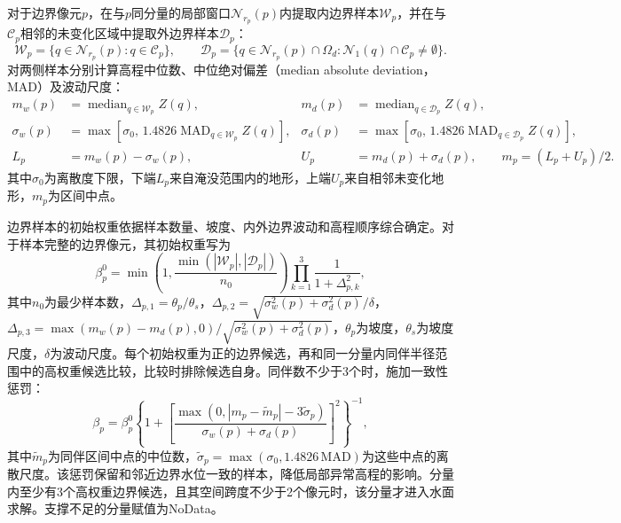 \documentclass[authoryear,preprint,12pt]{elsarticle}
\begin{document}
对于边界像元\(p\)，在与\(p\)同分量的局部窗口\(\mathcal N_{r_p}(p)\)内提取内边界样本\(\mathcal W_p\)，并在与\(\mathcal C_p\)相邻的未变化区域中提取外边界样本\(\mathcal D_p\)：
\begin{equation}\label{eq:ccdepth_samples}
 \mathcal W_p=\{q\in\mathcal N_{r_p}(p):q\in\mathcal C_p\},\qquad
 \mathcal D_p=\{q\in\mathcal N_{r_p}(p)\cap\Omega_d:\mathcal N_1(q)\cap\mathcal C_p\neq\emptyset\}.
\end{equation}
对两侧样本分别计算高程中位数、中位绝对偏差（median absolute deviation，MAD）及波动尺度：
\begin{equation}\label{eq:ccdepth_interval}
 \begin{aligned}
 m_w(p)&=\operatorname{median}_{q\in\mathcal W_p}Z(q),&
 m_d(p)&=\operatorname{median}_{q\in\mathcal D_p}Z(q),\\
 \sigma_w(p)&=\max\!\left[\sigma_0,\,1.4826\operatorname{MAD}_{q\in\mathcal W_p}Z(q)\right],&
 \sigma_d(p)&=\max\!\left[\sigma_0,\,1.4826\operatorname{MAD}_{q\in\mathcal D_p}Z(q)\right],\\
 L_p&=m_w(p)-\sigma_w(p),&
 U_p&=m_d(p)+\sigma_d(p),\qquad m_p=(L_p+U_p)/2.
 \end{aligned}
\end{equation}
其中\(\sigma_0\)为离散度下限，下端\(L_p\)来自淹没范围内的地形，上端\(U_p\)来自相邻未变化地形，\(m_p\)为区间中点。

边界样本的初始权重依据样本数量、坡度、内外边界波动和高程顺序综合确定。对于样本完整的边界像元，其初始权重写为
\begin{equation}\label{eq:ccdepth_weight}
 \beta_p^0=
 \min\!\left(1,\frac{\min(|\mathcal W_p|,|\mathcal D_p|)}{n_0}\right)
 \prod_{k=1}^{3}\frac{1}{1+\Delta_{p,k}^2},
\end{equation}
其中\(n_0\)为最少样本数，\(\Delta_{p,1}=\theta_p/\theta_s\)，\(\Delta_{p,2}=\sqrt{\sigma_w^2(p)+\sigma_d^2(p)}/\delta\)，\(\Delta_{p,3}=\max(m_w(p)-m_d(p),0)/\sqrt{\sigma_w^2(p)+\sigma_d^2(p)}\)，\(\theta_p\)为坡度，\(\theta_s\)为坡度尺度，\(\delta\)为波动尺度。每个初始权重为正的边界候选，再和同一分量内同伴半径范围中的高权重候选比较，比较时排除候选自身。同伴数不少于3个时，施加一致性惩罚：
\begin{equation}\label{eq:ccdepth_peer}
 \beta_p=\beta_p^0\left\{1+\left[\frac{\max(0,|m_p-\tilde m_p|-3\tilde\sigma_p)}{\sigma_w(p)+\sigma_d(p)}\right]^2\right\}^{-1},
\end{equation}
其中\(\tilde m_p\)为同伴区间中点的中位数，\(\tilde\sigma_p=\max(\sigma_0,1.4826\,\mathrm{MAD})\)为这些中点的离散尺度。该惩罚保留和邻近边界水位一致的样本，降低局部异常高程的影响。分量内至少有3个高权重边界候选，且其空间跨度不少于2个像元时，该分量才进入水面求解。支撑不足的分量赋值为NoData。
\end{document}
